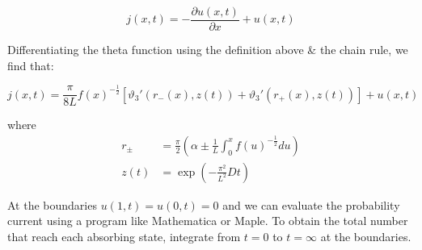 \documentclass[11pt]{article} %
\begin{document}
\begin{equation}
j(x,t) = -\frac{\partial u(x,t)}{\partial x} + u(x,t)
\end{equation}

Differentiating the theta function using the definition above \& the chain rule, we find that:

\begin{equation}
j(x,t) = \frac{\pi}{8L}f(x)^{-\frac{1}{2}}\left[ \vartheta_{3}'\left( r_{-}(x), z(t)\right) + \vartheta_{3}'\left( r_{+}(x), z(t)\right) \right] + u(x,t)
\end{equation}

where 
\begin{align}
r_{\pm} &= \frac{\pi}{2}\left(\alpha \pm \frac{1}{L}\int^{x}_{0} f(u)^{-\frac{1}{2}}du \right) \\
z(t) &= \exp\left(-\frac{\pi^{2}}{L^{2}}Dt\right)
\end{align}

At the boundaries $u(1,t) = u(0,t) = 0$ and we can evaluate the probability current using a program like Mathematica or Maple. To obtain the total number that reach each absorbing state, integrate from $t=0$ to $t = \infty$ at the boundaries.
\end{document}
